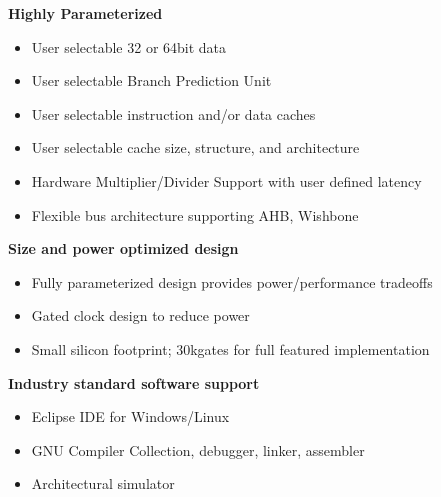 \textbf{Highly Parameterized}

\begin{itemize}
\item
  User selectable 32 or 64bit data
\item
  User selectable Branch Prediction Unit
\item
  User selectable instruction and/or data caches
\item
  User selectable cache size, structure, and architecture
\item
  Hardware Multiplier/Divider Support with user defined latency
\item
  Flexible bus architecture supporting AHB, Wishbone
\end{itemize}

\textbf{Size and power optimized design}

\begin{itemize}
\item
  Fully parameterized design provides power/performance tradeoffs
\item
  Gated clock design to reduce power
\item
  Small silicon footprint; 30kgates for full featured implementation
\end{itemize}

\textbf{Industry standard software support}

\begin{itemize}
\item
  Eclipse IDE for Windows/Linux
\item
  GNU Compiler Collection, debugger, linker, assembler
\item
  Architectural simulator
\end{itemize}
